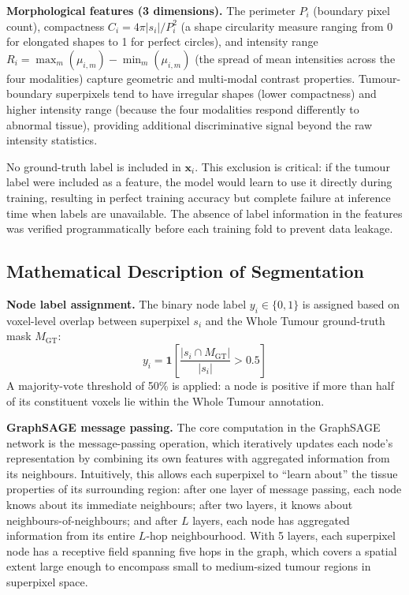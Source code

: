 \documentclass{article}
\begin{document}
\textbf{Morphological features (3 dimensions).} The perimeter $P_i$ (boundary
pixel count), compactness $C_i = 4\pi|s_i|/P_i^2$ (a shape circularity measure
ranging from 0 for elongated shapes to 1 for perfect circles), and intensity range
$R_i = \max_{m}(\mu_{i,m}) - \min_m(\mu_{i,m})$ (the spread of mean intensities
across the four modalities) capture geometric and multi-modal contrast properties.
Tumour-boundary superpixels tend to have irregular shapes (lower compactness) and
higher intensity range (because the four modalities respond differently to abnormal
tissue), providing additional discriminative signal beyond the raw intensity
statistics.

No ground-truth label is included in $\mathbf{x}_i$. This exclusion is critical:
if the tumour label were included as a feature, the model would learn to use it
directly during training, resulting in perfect training accuracy but complete
failure at inference time when labels are unavailable. The absence of label
information in the features was verified programmatically before each training
fold to prevent data leakage.

\subsection{Mathematical Description of Segmentation}
\label{sec:mathseg}

\textbf{Node label assignment.}
The binary node label $y_i \in \{0,1\}$ is assigned based on voxel-level overlap
between superpixel $s_i$ and the Whole Tumour ground-truth mask $M_{\text{GT}}$:
\[
    y_i = \mathbf{1}\!\left[
        \frac{|s_i \cap M_{\text{GT}}|}{|s_i|} > 0.5
    \right]
\]
A majority-vote threshold of 50\% is applied: a node is positive if more than half
of its constituent voxels lie within the Whole Tumour annotation.

\textbf{GraphSAGE message passing.}
The core computation in the GraphSAGE network is the message-passing operation,
which iteratively updates each node's representation by combining its own features
with aggregated information from its neighbours. Intuitively, this allows each
superpixel to ``learn about'' the tissue properties of its surrounding region: after
one layer of message passing, each node knows about its immediate neighbours; after
two layers, it knows about neighbours-of-neighbours; and after $L$ layers, each
node has aggregated information from its entire $L$-hop neighbourhood. With 5 layers,
each superpixel node has a receptive field spanning five hops in the graph, which
covers a spatial extent large enough to encompass small to medium-sized tumour
regions in superpixel space.
\end{document}
